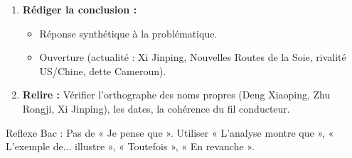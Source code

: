 \documentclass[11pt]{article}
\newcommand{\cle}[1]{{\popxbold\color{popdark}#1}}
\begin{document}
\begin{methode}
\begin{enumerate}
\begin{itemize}
    \end{itemize}
    \item \textbf{Rédiger la conclusion :} 
    \begin{itemize}
        \item Réponse synthétique à la problématique.
        \item Ouverture (actualité : Xi Jinping, Nouvelles Routes de la Soie, rivalité US/Chine, dette Cameroun).
    \end{itemize}
    \item \textbf{Relire :} Vérifier l'orthographe des noms propres (Deng Xiaoping, Zhu Rongji, Xi Jinping), les dates, la cohérence du fil conducteur.
\end{enumerate}
\cle{Reflexe Bac :} Pas de « Je pense que ». Utiliser « L'analyse montre que », « L'exemple de... illustre », « Toutefois », « En revanche ».
\end{methode}
\end{document}
